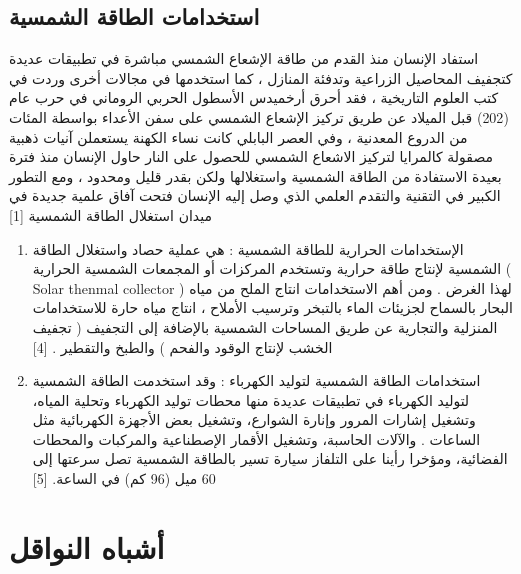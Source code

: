 	\subsection{استخدامات الطاقة الشمسية}	
	استفاد الإنسان منذ القدم من طاقة الإشعاع الشمسي مباشرة في تطبيقات عديدة كتجفيف المحاصيل الزراعية وتدفئة المنازل ، كما استخدمها في مجالات أخرى وردت في كتب العلوم التاريخية ، فقد أحرق أرخميدس الأسطول الحربي الروماني في حرب عام (202) قبل الميلاد عن طريق تركيز الإشعاع الشمسي على سفن الأعداء بواسطة المئات من الدروع المعدنية ، وفي العصر البابلي كانت نساء الكهنة يستعملن آنيات ذهبية مصقولة كالمرايا لتركيز الاشعاع الشمسي للحصول على النار 
	حاول الإنسان منذ فترة بعيدة الاستفادة من الطاقة الشمسية واستغلالها ولكن بقدر قليل ومحدود ، ومع التطور الكبير في التقنية والتقدم العلمي الذي وصل إليه الإنسان فتحت آفاق علمية جديدة في ميدان استغلال الطاقة الشمسية
	[1]
	\begin{enumerate}
		\item الإستخدامات الحرارية للطاقة الشمسية  
		:
		هي عملية حصاد واستغلال الطاقة الشمسية لإنتاج طاقة حرارية وتستخدم المركزات أو المجمعات الشمسية الحرارية ( Solar thenmal collector ) لهذا الغرض .
		ومن أهم الاستخدامات انتاج الملح من مياه البحار بالسماح لجزيئات الماء بالتبخر وترسيب الأملاح ، انتاج مياه حارة للاستخدامات المنزلية والتجارية عن طريق المساحات الشمسية بالإضافة إلى التجفيف ( تجفيف الخشب لإنتاج الوقود والفحم ) والطبخ والتقطير
		.
		[4]
		\item استخدامات الطاقة الشمسية لتوليد الكهرباء 
		:
		وقد استخدمت الطاقة الشمسية لتوليد الكهرباء في تطبيقات عديدة منها محطات توليد الكهرباء وتحلية المياه، وتشغيل إشارات المرور وإنارة الشوارع، وتشغيل بعض الأجهزة الكهربائية مثل الساعات . والآلات الحاسبة، وتشغيل الأقمار الإصطناعية والمركبات والمحطات الفضائية، ومؤخرا رأينا على التلفاز سيارة تسير بالطاقة الشمسية تصل سرعتها إلى 60 ميل (96 كم) في الساعة.
		[5]
	\end{enumerate}
	\section {أشباه النواقل }
	
